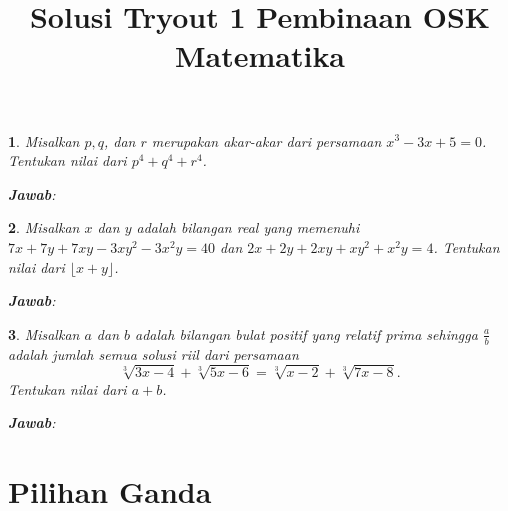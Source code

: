 \documentclass[11pt,a4paper,DIV=12]{scrartcl}
\newcommand\answerbox{%
\vspace*{0.5cm}%
\noindent\textbf{\textsf{Jawab}}: \fbox{\rule{14cm}{0pt}\rule[-0.2ex]{0pt}{1.9ex}}}
\theoremstyle{problemstyle}
\newtheorem{problem}{}
\theoremstyle{answerstyle}
\begin{document}
\begin{problem}
  Misalkan $p, q$, dan $r$ merupakan akar-akar dari persamaan $x^3 - 3x + 5 = 0$. Tentukan nilai dari $p^4 + q^4 + r^4$.

  \answerbox
\end{problem}

\begin{problem}
  Misalkan $x$ dan $y$ adalah bilangan real yang memenuhi $7x + 7y + 7xy - 3xy^2 - 3x^2y = 40$ dan $2x + 2y + 2xy + xy^2 + x^2y = 4$. Tentukan nilai dari $\lfloor x + y \rfloor$.

  \answerbox
\end{problem}

\begin{problem}
  Misalkan $a$ dan $b$ adalah bilangan bulat positif yang relatif prima sehingga $\frac{a}{b}$ adalah jumlah semua solusi riil dari persamaan
  \[
    \sqrt[3]{3x - 4} + \sqrt[3]{5x - 6} = \sqrt[3]{x - 2} + \sqrt[3]{7x - 8}.
  \]
  Tentukan nilai dari $a + b$.

  \answerbox
\end{problem}

\newpage
\title{Solusi Tryout 1 Pembinaan OSK Matematika}
\author{}
\date{}
\maketitle
\vspace{-2cm}
\section*{Pilihan Ganda}
\end{document}
